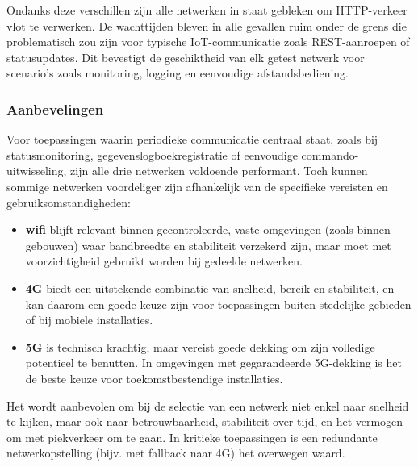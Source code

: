 Ondanks deze verschillen zijn alle netwerken in staat gebleken om HTTP-verkeer vlot te verwerken. De wachttijden bleven in alle gevallen ruim onder de grens die problematisch zou zijn voor typische IoT-communicatie zoals REST-aanroepen of statusupdates. Dit bevestigt de geschiktheid van elk getest netwerk voor scenario’s zoals monitoring, logging en eenvoudige afstandsbediening.

\subsubsection{Aanbevelingen}
Voor toepassingen waarin periodieke communicatie centraal staat, zoals bij statusmonitoring, gegevenslogboekregistratie of eenvoudige commando-uitwisseling, zijn alle drie netwerken voldoende performant. Toch kunnen sommige netwerken voordeliger zijn afhankelijk van de specifieke vereisten en gebruiksomstandigheden:

\begin{itemize}
    \item \textbf{wifi} blijft relevant binnen gecontroleerde, vaste omgevingen (zoals binnen gebouwen) waar bandbreedte en stabiliteit verzekerd zijn, maar moet met voorzichtigheid gebruikt worden bij gedeelde netwerken.
    \item \textbf{4G} biedt een uitstekende combinatie van snelheid, bereik en stabiliteit, en kan daarom een goede keuze zijn voor toepassingen buiten stedelijke gebieden of bij mobiele installaties.
    \item \textbf{5G} is technisch krachtig, maar vereist goede dekking om zijn volledige potentieel te benutten. In omgevingen met gegarandeerde 5G-dekking is het de beste keuze voor toekomstbestendige installaties.
    
\end{itemize}

Het wordt aanbevolen om bij de selectie van een netwerk niet enkel naar snelheid te kijken, maar ook naar betrouwbaarheid, stabiliteit over tijd, en het vermogen om met piekverkeer om te gaan. In kritieke toepassingen is een redundante netwerkopstelling (bijv. met fallback naar 4G) het overwegen waard.





